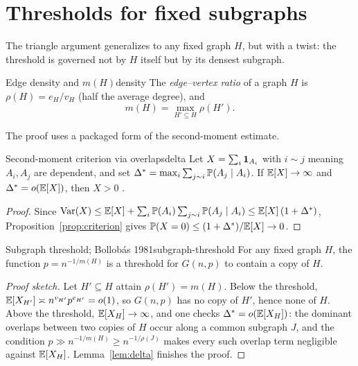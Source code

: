 \section{Thresholds for fixed subgraphs}

The triangle argument generalizes to any fixed graph $H$, but with a twist: the
threshold is governed not by $H$ itself but by its densest subgraph.

\begin{definition}{Edge density and $m(H)$}{density}
The \emph{edge--vertex ratio} of a graph $H$ is $\rho(H)=e_H/v_H$ (half the
average degree), and
\[
  m(H)=\max_{H'\subseteq H}\rho(H').
\]
\end{definition}

The proof uses a packaged form of the second-moment estimate.

\begin{lemma}{Second-moment criterion via overlaps}{delta}
Let $X=\sum_i\mathbf{1}_{A_i}$ with $i\sim j$ meaning $A_i,A_j$ are dependent, and set
$\Delta^\ast=\max_i\sum_{j\sim i}\mathbb{P}(A_j\mid A_i)$. If $\mathbb{E}[X]\to\infty$ and
$\Delta^\ast=o(\mathbb{E}[X])$, then $X>0$ \whp.
\end{lemma}

\begin{proof}
Since $\operatorname{Var}(X)\le\mathbb{E}[X]+\sum_i\mathbb{P}(A_i)\sum_{j\sim i}\mathbb{P}(A_j\mid A_i)
\le\mathbb{E}[X]\,(1+\Delta^\ast)$, Proposition~\ref{prop:criterion} gives
$\mathbb{P}(X=0)\le(1+\Delta^\ast)/\mathbb{E}[X]\to0$.
\end{proof}

\begin{theorem}{Subgraph threshold; Bollob\'as 1981}{subgraph-threshold}
For any fixed graph $H$, the function $p=n^{-1/m(H)}$ is a threshold for $G(n,p)$
to contain a copy of $H$.
\end{theorem}

\begin{proof}[Proof sketch]
Let $H'\subseteq H$ attain $\rho(H')=m(H)$. Below the threshold,
$\mathbb{E}[X_{H'}]\asymp n^{v_{H'}}p^{e_{H'}}=o(1)$, so $G(n,p)$ has no copy of $H'$,
hence none of $H$. Above the threshold, $\mathbb{E}[X_H]\to\infty$, and one checks
$\Delta^\ast=o(\mathbb{E}[X_H])$: the dominant overlaps between two copies of $H$
occur along a common subgraph $J$, and the condition $p\gg n^{-1/m(H)}\ge
n^{-1/\rho(J)}$ makes every such overlap term negligible against $\mathbb{E}[X_H]$.
Lemma~\ref{lem:delta} finishes the proof.
\end{proof}


